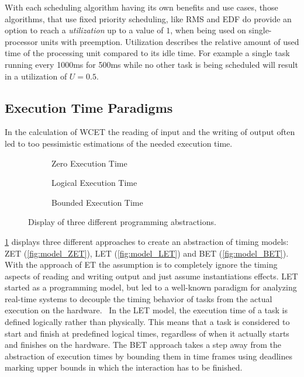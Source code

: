With each scheduling algorithm having its own benefits and use cases, those algorithms, that use fixed priority scheduling, like \ac{RMS} and \ac{EDF} do provide an option to reach a \textit{utilization} up to a value of $1$, when being used on single-processor units with preemption\cite{liuSchedulingAlgorithmsMultiprogramming1973}.
Utilization describes the relative amount of used time of the processing unit compared to its idle time.
For example a single task running every 1000ms for 500ms while no other task is being scheduled will result in a utilization of $U=0.5$.

\subsection{Execution Time Paradigms}\label{sec:let}
In the calculation of \ac{WCET} the reading of input and the writing of output often led to too pessimistic estimations of the needed execution time.
\begin{figure}[t!]
	\begin{subfigure}[c]{0.32\textwidth}
		\resizebox{\textwidth}{!}{%
			\label{fig:model_ZET}
			
		}
		\caption{Zero Execution Time}
	\end{subfigure}
	\hfill
	\begin{subfigure}[c]{0.32\textwidth}
		\resizebox{\textwidth}{!}{%
			\label{fig:model_LET}
			
			}
		\caption{Logical Execution Time}
	\end{subfigure}
	\hfill
	\begin{subfigure}[c]{0.32\textwidth}
		\resizebox{\textwidth}{!}{%
			\label{fig:model_BET}
			
		}
		\caption{Bounded Execution Time}
	\end{subfigure}
	\caption{Display of three different programming abstractions\cite{chakrabortyAdvancesRealTimeSystems2012}.}
	\label{fig:model_ZET_LET_BET}
\end{figure}
\cref{fig:model_ZET_LET_BET} displays three different approaches to create an abstraction of timing models: \ac{ZET} (\cref{fig:model_ZET}), \ac{LET} (\cref{fig:model_LET}) and \ac{BET} (\cref{fig:model_BET}).
With the approach of \ac{ET} the assumption is to completely ignore the timing aspects of reading and writing output and just assume instantiations effects\cite{chakrabortyAdvancesRealTimeSystems2012}.
\ac{LET} started as a programming model, but led to a well-known paradigm for analyzing real-time systems to decouple the timing behavior of tasks from the actual execution on the hardware. \
In the \ac{LET} model, the execution time of a task is defined logically rather than physically. This means that a task is considered to start and finish at predefined logical times, regardless of when it actually starts and finishes on the hardware\cite{chakrabortyAdvancesRealTimeSystems2012}.
The \ac{BET} approach takes a step away from the abstraction of execution times by bounding them in time frames using deadlines marking upper bounds in which the interaction has to be finished\cite{chakrabortyAdvancesRealTimeSystems2012}.

